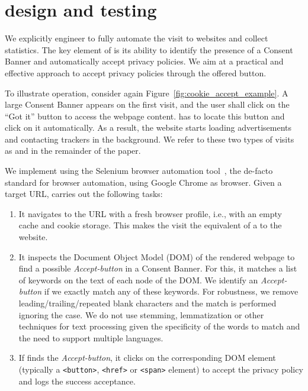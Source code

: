 \section{\TOOL design and testing}
\label{sec:metho}

We explicitly engineer \TOOL to fully automate the visit to websites and collect statistics. The key element of \TOOL is its ability to identify the presence of a Consent Banner and automatically accept privacy policies. We aim at a practical and effective approach to accept privacy policies through the offered button. %

To illustrate \TOOL operation, consider again Figure~\ref{fig:cookie_accept_example}. A large Consent Banner appears on the first visit, and the user shall click on the ``Got it'' button to access the webpage content. \TOOL has to locate this button and click on it automatically. As a result, the website starts loading advertisements and contacting trackers in the background. We refer to these two types of visits as \BEFORE and \AFTER in the remainder of the paper.

We implement \TOOL using the Selenium browser automation tool~\cite{avasarala2014selenium}, the de-facto standard for browser automation, using Google Chrome as browser. Given a target URL, \TOOL carries out the following tasks:
\begin{enumerate}
    \item It navigates to the URL with a fresh browser profile, i.e., with an empty cache and cookie storage. This makes the visit the equivalent of a \BEFORE to the website.
    \item It inspects the Document Object Model (DOM) of the rendered webpage to find a possible \emph{Accept-button} in a Consent Banner. For this, it matches a list of keywords on the text of each node of the DOM. We identify an \emph{Accept-button} if we exactly match any of these keywords. For robustness, we remove leading/trailing/repeated blank characters and the match is performed ignoring the case. We do not use stemming, lemmatization or other techniques for text processing given the specificity of the words to match and the need to support multiple languages.
    \item If \TOOL finds the \emph{Accept-button}, it clicks on the corresponding DOM element (typically a \texttt{<button>}, \texttt{<href>} or \texttt{<span>} element) to accept the privacy policy and logs the success acceptance.
\end{enumerate}

